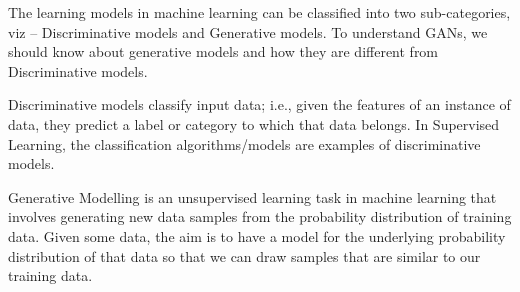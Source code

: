 

The learning models in machine learning can be classified into two sub-categories, viz – Discriminative models and Generative models. To understand GANs, we should know about generative models and how they are different from Discriminative models.

Discriminative models classify input data; i.e., given the features of an instance of data, they predict a label or category to which that data belongs. In Supervised Learning, the classification algorithms/models are examples of discriminative models.

Generative Modelling is an unsupervised learning task in machine learning that involves generating new data samples from the probability distribution of training data. Given some data, the aim is to have a model for the underlying probability distribution of that data so that we can draw samples that are similar to our training data.



